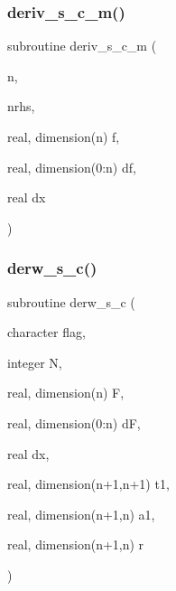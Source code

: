 \mbox{\label{ders__n_8f_a2e4d9d718762935497b9d458cc02f4f9}} 
\subsubsection{\texorpdfstring{deriv\+\_\+s\+\_\+c\+\_\+m()}{deriv\_s\_c\_m()}}
{\footnotesize\ttfamily subroutine deriv\+\_\+s\+\_\+c\+\_\+m (\begin{DoxyParamCaption}\item[{}]{n,  }\item[{}]{nrhs,  }\item[{real, dimension(n)}]{f,  }\item[{real, dimension(0\+:n)}]{df,  }\item[{real}]{dx }\end{DoxyParamCaption})}

\mbox{\label{ders__n_8f_a1c1e557772704039702890857b2e9089}} 
\subsubsection{\texorpdfstring{derw\+\_\+s\+\_\+c()}{derw\_s\_c()}}
{\footnotesize\ttfamily subroutine derw\+\_\+s\+\_\+c (\begin{DoxyParamCaption}\item[{character}]{flag,  }\item[{integer}]{N,  }\item[{real, dimension(n)}]{F,  }\item[{real, dimension(0\+:n)}]{dF,  }\item[{real}]{dx,  }\item[{real, dimension(n+1,n+1)}]{t1,  }\item[{real, dimension(n+1,n)}]{a1,  }\item[{real, dimension(n+1,n)}]{r }\end{DoxyParamCaption})}

\mbox{\label{ders__n_8f_abf1c05125911f7af8594b57fc08173d6}} 
